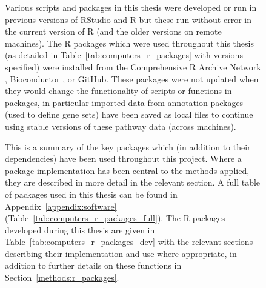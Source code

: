 \begin{figure}[!htp]
Various scripts and packages in this thesis were developed or run in previous versions of RStudio and R but these run without error in the current version of R (and the older versions on remote machines). The R packages which were used throughout this thesis (as detailed in Table~\ref{tab:computers_r_packages} with versions specified) were installed from the Comprehensive R Archive Network \citep{CRAN}, Bioconductor \citep[][version 3.4; BiocInstaller 1.24.0]{Gentleman2004}, or GitHub. These packages were not updated when they would change the functionality of scripts or functions in packages, in particular imported data from annotation packages (used to define gene sets) have been saved as local files to continue using stable versions of these pathway data (across machines).

This is a summary of the key packages which (in addition to their dependencies) have been used throughout this project. Where a package implementation has been central to the methods applied, they are described in more detail in the relevant section. A full table of packages used in this thesis can be found in Appendix~\ref{appendix:software} (Table~\ref{tab:computers_r_packages_full}). The R packages developed during this thesis are given in Table~\ref{tab:computers_r_packages_dev} with the relevant sections describing their implementation and use where appropriate, in addition to further details on these functions in Section~\ref{methods:r_packages}. 


\end{figure}
